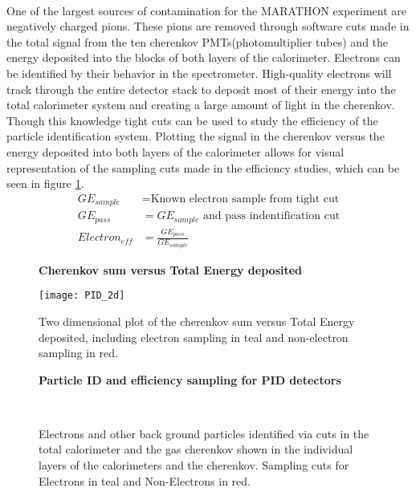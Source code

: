\paragraph{} One of the largest sources of contamination for the MARATHON experiment are negatively charged pions. These pions are removed through software cuts made in the total signal from the ten cherenkov PMTs(photomultiplier tubes) and the energy deposited into the blocks of both layers of the calorimeter. Electrons can be identified by their behavior in the spectrometer. High-quality electrons will track through the entire detector stack to deposit most of their energy into the total calorimeter system and creating a large amount of light in the cherenkov. Though this knowledge tight cuts can be used to study the efficiency of the particle identification system. Plotting the signal in the cherenkov versus the energy deposited into both layers of the calorimeter allows for visual representation of the sampling cuts made in the efficiency studies, which can be seen in figure \ref{elesample}. 
\begin{equation}\label{effequ}
\begin{split}
GE_{sample} & = \textrm{Known electron sample from tight cut}  \\
GE_{pass} & = \textrm{$GE_{sample}$ and pass indentification cut} \\
Electron_{eff}  & = \frac{ GE_{pass} } { GE_{sample} } 
\end{split}
\end{equation}
\begin{figure}[]
	\centering
	\textbf{Cherenkov sum versus Total Energy deposited }\par\medskip
	\texttt{[image: PID\_2d]}
	\caption{Two dimensional plot of the cherenkov sum versus Total Energy deposited, including electron sampling in teal and non-electron sampling in red. }
	\label{elesample}
\end{figure}

\begin{figure}[t]%
	{\centering
		\textbf{Particle ID and efficiency sampling for PID detectors }\par\medskip}
	\centering
	\\
	\caption{Electrons and other back ground particles identified via cuts in the total calorimeter and the gas cherenkov shown in the individual layers of the calorimeters and the cherenkov. Sampling cuts for Electrons in teal and Non-Electrons in red.}%
	\label{sampling}%
\end{figure}


